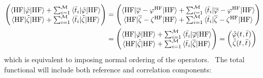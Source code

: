 \begin{equation}
  \begin{aligned}
  \begin{pmatrix}
   \braket{\mathrm{HF} | \tilde{\varphi} | \mathrm{HF}}
  + \sum_{i=1}^{\mathcal{M}}\braket{\bar{t}_{i} | \tilde{\varphi} | \mathrm{HF}} \\
   \braket{\mathrm{HF} | \tilde{\zeta} | \mathrm{HF}}
  + \sum_{i=1}^{\mathcal{M}}\braket{\bar{t}_{i} | \tilde{\zeta} | \mathrm{HF}}
  \end{pmatrix}
  &=
  \begin{pmatrix}
    \braket{\mathrm{HF} | \overline{\varphi} - \varphi^\mathrm{HF} | \mathrm{HF}}
  + \sum_{i=1}^{\mathcal{M}}\braket{\bar{t}_{i} | \overline{\varphi} - \varphi^\mathrm{HF} | \mathrm{HF}} \\
  \braket{\mathrm{HF} | \overline{\zeta} - \zeta^\mathrm{HF} | \mathrm{HF}}
  + \sum_{i=1}^{\mathcal{M}}\braket{\bar{t}_{i} | \overline{\zeta} -
  \zeta^\mathrm{HF}| \mathrm{HF}}
  \end{pmatrix}
  \\
  &=
  \begin{pmatrix}
   \braket{\mathrm{HF} | \tilde{\varphi} | \mathrm{HF}}
  + \sum_{i=1}^{\mathcal{M}}\braket{\bar{t}_{i} | \overline{\varphi} | \mathrm{HF}} \\
   \braket{\mathrm{HF} | \tilde{\zeta} | \mathrm{HF}}
  + \sum_{i=1}^{\mathcal{M}}\braket{\bar{t}_{i} | \overline{\zeta} | \mathrm{HF}}
  \end{pmatrix}
  =
  \begin{pmatrix}
    \tilde{\varphi}(t_{}, \bar{t}_{}) \\
    \tilde{\zeta}(t_{}, \bar{t}_{})
  \end{pmatrix}
\end{aligned}
\end{equation}
which is equivalent to imposing normal ordering of the
operators.~\autocite{Shavitt}
The total functional will include both reference and correlation
components:
